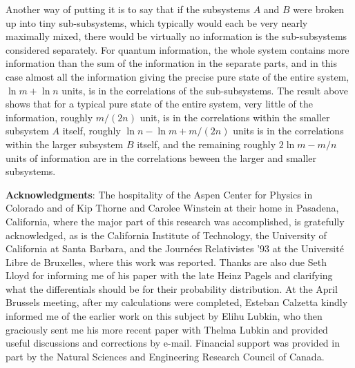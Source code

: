 Another way of putting it is to say that if the subsystems $A$ and
$B$ were
broken up into tiny sub-subsystems, which typically would each be
very nearly
maximally mixed, there would be virtually no information is the
sub-subsystems
considered separately.  For quantum information, the whole system
contains more
information than the sum of the information in the separate parts,
and in this
case almost all the information giving the precise pure state of the
entire
system, $\ln m+\ln n$ units, is in the correlations of the
sub-subsystems.  The
result above shows that for a typical pure state of the entire
system, very
little of the information, roughly $m/(2n)$ unit, is in the
correlations within
the smaller subsystem $A$ itself, roughly $\ln n -\ln m +m/(2n)$
units is in
the
correlations within the larger subsystem $B$ itself, and the
remaining roughly
$2\ln m -m/n$ units of information are in the correlations beween the
larger
and
smaller subsystems.

{\bf Acknowledgments}:  The hospitality of the Aspen Center for
Physics in
Colorado and of Kip Thorne and Carolee Winstein at their home in
Pasadena,
California, where the major part of this research was accomplished,
is
gratefully acknowledged, as is the California Institute of
Technology, the
University of California at Santa Barbara, and the Journ\'{e}es
Relativistes
'93 at the Universit\'{e} Libre de Bruxelles, where this work was
reported.
Thanks are also due Seth Lloyd for informing me of his paper with the
late
Heinz Pagels and clarifying what the differentials should be for
their
probability distribution.  At the April Brussels meeting, after my
calculations
were completed, Esteban Calzetta kindly informed me of  the earlier
work on
this subject by Elihu Lubkin, who then graciously sent me his more
recent paper
with Thelma Lubkin and provided useful discussions and corrections by
e-mail.
Financial support was provided in part by the
Natural Sciences and Engineering Research Council of Canada.

